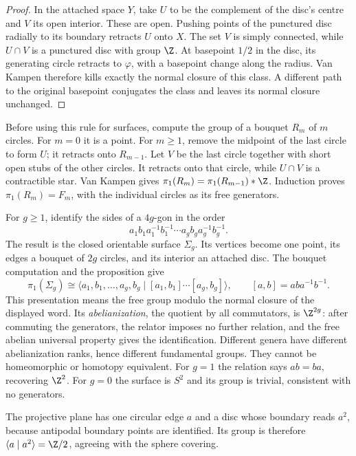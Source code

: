 \begin{proof}
In the attached space $Y$, take $U$ to be the complement of the disc's centre and $V$ its open interior. These are open. Pushing points of the punctured disc radially to its boundary retracts $U$ onto $X$. The set $V$ is simply connected, while $U\cap V$ is a punctured disc with group $\Z$. At basepoint $1/2$ in the disc, its generating circle retracts to $\varphi$, with a basepoint change along the radius. Van Kampen therefore kills exactly the normal closure of this class. A different path to the original basepoint conjugates the class and leaves its normal closure unchanged.
\end{proof}

Before using this rule for surfaces, compute the group of a bouquet $R_m$ of $m$ circles. For $m=0$ it is a point. For $m\ge1$, remove the midpoint of the last circle to form $U$; it retracts onto $R_{m-1}$. Let $V$ be the last circle together with short open stubs of the other circles. It retracts onto that circle, while $U\cap V$ is a contractible star. Van Kampen gives $\pi_1(R_m)=\pi_1(R_{m-1})\ast\Z$. Induction proves $\pi_1(R_m)=F_m$, with the individual circles as its free generators.

\begin{example}\label{ex:surfaces}
For $g\ge1$, identify the sides of a $4g$-gon in the order
\[
a_1b_1a_1^{-1}b_1^{-1}\cdots a_gb_ga_g^{-1}b_g^{-1}.
\]
The result is the closed orientable surface $\Sigma_g$. Its vertices become one point, its edges a bouquet of $2g$ circles, and its interior an attached disc. The bouquet computation and the proposition give
\[
\pi_1(\Sigma_g)\cong
\langle a_1,b_1,\ldots,a_g,b_g\mid [a_1,b_1]\cdots[a_g,b_g]\rangle,
\qquad [a,b]=aba^{-1}b^{-1}.
\]
This presentation means the free group modulo the normal closure of the displayed word. Its \emph{abelianization}, the quotient by all commutators, is $\Z^{2g}$: after commuting the generators, the relator imposes no further relation, and the free abelian universal property gives the identification. Different genera have different abelianization ranks, hence different fundamental groups. They cannot be homeomorphic or homotopy equivalent. For $g=1$ the relation says $ab=ba$, recovering $\Z^2$. For $g=0$ the surface is $S^2$ and its group is trivial, consistent with no generators.

The projective plane has one circular edge $a$ and a disc whose boundary reads $a^2$, because antipodal boundary points are identified. Its group is therefore $\langle a\mid a^2\rangle=\Z/2$, agreeing with the sphere covering.
\end{example}

